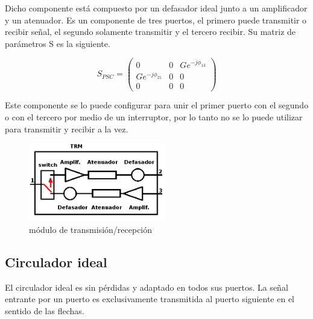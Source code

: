 Dicho componente está compuesto por un defasador ideal junto a un amplificador y un atenuador. Es un componente de tres puertos,
el primero puede transmitir o recibir señal, el segundo solamente transmitir y el tercero recibir. Su matriz de parámetros S es
la siguiente.

$$
	S_{PSC} = \begin{pmatrix} 0&0&Ge^{-j\phi_{13}} \\ Ge^{-j\phi_{21}}&0&0 \\ 0&0&0\end{pmatrix} 
$$

Este componente se lo puede configurar para unir el primer puerto con el segundo o con el tercero por medio de un interruptor, 
por lo tanto no se lo puede utilizar para transmitir y recibir a la vez. 

\begin{figure}[H]
 \centering
 \includegraphics[width=6cm]{gfx/trm.png}
 \caption{módulo de transmisión/recepción}
 \label{fig:trm}
\end{figure}


\subsection{Circulador ideal}

El circulador ideal es sin pérdidas y adaptado en todos sus puertos. La señal entrante por un puerto es exclusivamente
transmitida al puerto siguiente en el sentido de las flechas.

